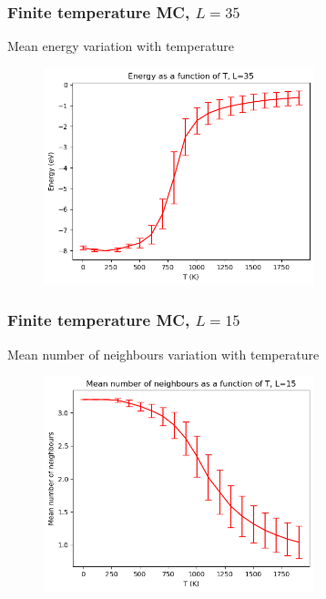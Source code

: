 \documentclass{beamer}
\begin{document}
\begin{frame}
    \frametitle{Finite temperature MC, $L=35$}

    \centering Mean energy variation with temperature

    \begin{figure}
        \includegraphics[width=0.7\textwidth]{images/cenergy35.png}
    \end{figure}

\end{frame}

\begin{frame}
    \frametitle{Finite temperature MC, $L=15$}

    \centering Mean number of neighbours variation with temperature

    \begin{figure}
        \includegraphics[width=0.7\textwidth]{images/nn15real.png}
    \end{figure}

\end{frame}
\end{document}
